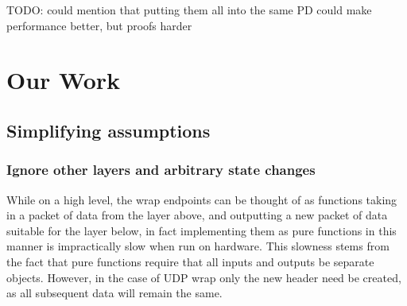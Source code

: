 \documentclass[twoside]{memoir}
\begin{document}
TODO: could mention that putting them all into the same PD could make performance
better, but proofs harder
%
%
%


\chapter{Our Work}
\section{Simplifying assumptions}
\subsection{Ignore other layers and arbitrary state changes}
While on a high level, the wrap endpoints can be thought of as
functions taking in a packet of data from the layer above, and outputting a 
new packet of data suitable for the layer below,
in fact implementing them as pure functions in this manner
is impractically slow when run on hardware.
This slowness stems from the fact that pure functions require that all inputs and outputs be
separate objects.
However, in the case of UDP wrap only the new header need be created,
as all subsequent data will remain the same.
\end{document}
